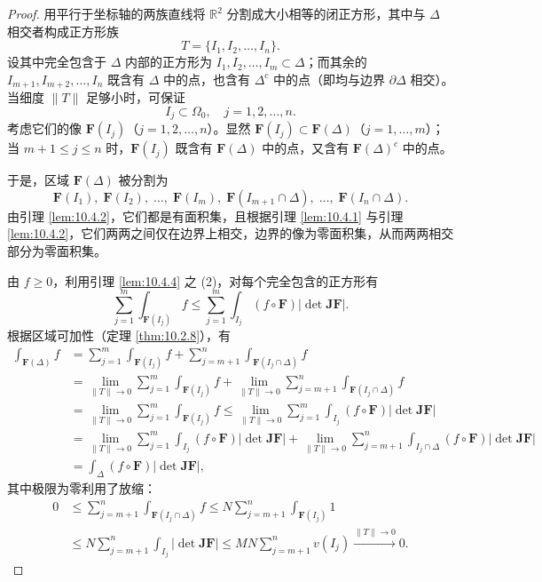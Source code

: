 \begin{proof}
用平行于坐标轴的两族直线将 $\mathbb{R}^2$ 分割成大小相等的闭正方形，其中与 $\Delta$ 相交者构成正方形族
\[
T = \{I_1, I_2, \dots, I_n\}.
\]
设其中完全包含于 $\Delta$ 内部的正方形为 $I_1, I_2, \dots, I_m \subset \Delta$；而其余的 $I_{m+1}, I_{m+2}, \dots, I_n$ 既含有 $\Delta$ 中的点，也含有 $\Delta^c$ 中的点（即均与边界 $\partial\Delta$ 相交）。当细度 $\|T\|$ 足够小时，可保证
\[
I_j \subset \Omega_0,\quad j = 1, 2, \dots, n.
\]
考虑它们的像 $\boldsymbol{F}(I_j)$（$j = 1, 2, \dots, n$）。显然 $\boldsymbol{F}(I_j) \subset \boldsymbol{F}(\Delta)$（$j = 1, \dots, m$）；当 $m+1 \leqslant j \leqslant n$ 时，$\boldsymbol{F}(I_j)$ 既含有 $\boldsymbol{F}(\Delta)$ 中的点，又含有 $\boldsymbol{F}(\Delta)^c$ 中的点。

于是，区域 $\boldsymbol{F}(\Delta)$ 被分割为
\[
\boldsymbol{F}(I_1),\; \boldsymbol{F}(I_2),\; \dots,\; \boldsymbol{F}(I_m),\; \boldsymbol{F}(I_{m+1} \cap \Delta),\; \dots,\; \boldsymbol{F}(I_n \cap \Delta).
\]
由引理 \ref{lem:10.4.2}，它们都是有面积集，且根据引理 \ref{lem:10.4.1} 与引理 \ref{lem:10.4.2}，它们两两之间仅在边界上相交，边界的像为零面积集，从而两两相交部分为零面积集。

由 $f \geqslant 0$，利用引理 \ref{lem:10.4.4} 之 (2)，对每个完全包含的正方形有
\[
\sum_{j=1}^m \int_{\boldsymbol{F}(I_j)} f \leqslant \sum_{j=1}^m \int_{I_j} (f \circ \boldsymbol{F}) \left|\det \boldsymbol{J}\boldsymbol{F}\right|.
\]
根据区域可加性（定理 \ref{thm:10.2.8}），有
\begin{align*}
\int_{\boldsymbol{F}(\Delta)} f &= \sum_{j=1}^m \int_{\boldsymbol{F}(I_j)} f + \sum_{j=m+1}^n \int_{\boldsymbol{F}(I_j \cap \Delta)} f \\
&= \lim_{\|T\| \to 0} \sum_{j=1}^m \int_{\boldsymbol{F}(I_j)} f + \lim_{\|T\| \to 0} \sum_{j=m+1}^n \int_{\boldsymbol{F}(I_j \cap \Delta)} f \\
&= \lim_{\|T\| \to 0} \sum_{j=1}^m \int_{\boldsymbol{F}(I_j)} f \leqslant \lim_{\|T\| \to 0} \sum_{j=1}^m \int_{I_j} (f \circ \boldsymbol{F}) \left|\det \boldsymbol{J}\boldsymbol{F}\right| \\
&= \lim_{\|T\| \to 0} \sum_{j=1}^m \int_{I_j} (f \circ \boldsymbol{F}) \left|\det \boldsymbol{J}\boldsymbol{F}\right| + \lim_{\|T\| \to 0} \sum_{j=m+1}^n \int_{I_j \cap \Delta} (f \circ \boldsymbol{F}) \left|\det \boldsymbol{J}\boldsymbol{F}\right| \\
&= \int_\Delta (f \circ \boldsymbol{F}) \left|\det \boldsymbol{J}\boldsymbol{F}\right|,
\end{align*}
其中极限为零利用了放缩：
\begin{align*}
0 &\leqslant \sum_{j=m+1}^n \int_{\boldsymbol{F}(I_j \cap \Delta)} f \leqslant N \sum_{j=m+1}^n \int_{\boldsymbol{F}(I_j)} 1 \\
&\leqslant N \sum_{j=m+1}^n \int_{I_j} \left|\det \boldsymbol{J}\boldsymbol{F}\right| \leqslant MN \sum_{j=m+1}^n v(I_j) \xrightarrow{\|T\| \to 0} 0.
\end{align*}


\end{proof}
